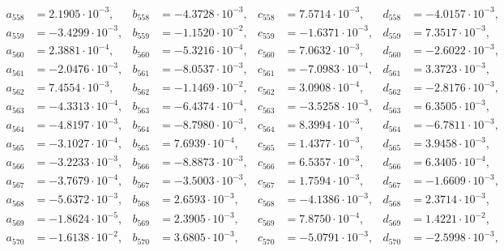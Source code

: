 \begin{align*}
  a_{ 558 } &= 2.1905 \cdot 10^{ -3 }, & b_{ 558 } &= -4.3728 \cdot 10^{ -3 }, & c_{ 558 } &= 7.5714 \cdot 10^{ -3 }, & d_{ 558 } &= -4.0157 \cdot 10^{ -3 }, \\ 
  a_{ 559 } &= -3.4299 \cdot 10^{ -3 }, & b_{ 559 } &= -1.1520 \cdot 10^{ -2 }, & c_{ 559 } &= -1.6371 \cdot 10^{ -3 }, & d_{ 559 } &= 7.3517 \cdot 10^{ -3 }, \\ 
  a_{ 560 } &= 2.3881 \cdot 10^{ -4 }, & b_{ 560 } &= -5.3216 \cdot 10^{ -4 }, & c_{ 560 } &= 7.0632 \cdot 10^{ -3 }, & d_{ 560 } &= -2.6022 \cdot 10^{ -3 }, \\ 
  a_{ 561 } &= -2.0476 \cdot 10^{ -3 }, & b_{ 561 } &= -8.0537 \cdot 10^{ -3 }, & c_{ 561 } &= -7.0983 \cdot 10^{ -4 }, & d_{ 561 } &= 3.3723 \cdot 10^{ -3 }, \\ 
  a_{ 562 } &= 7.4554 \cdot 10^{ -3 }, & b_{ 562 } &= -1.1469 \cdot 10^{ -2 }, & c_{ 562 } &= 3.0908 \cdot 10^{ -4 }, & d_{ 562 } &= -2.8176 \cdot 10^{ -3 }, \\ 
  a_{ 563 } &= -4.3313 \cdot 10^{ -4 }, & b_{ 563 } &= -6.4374 \cdot 10^{ -4 }, & c_{ 563 } &= -3.5258 \cdot 10^{ -3 }, & d_{ 563 } &= 6.3505 \cdot 10^{ -3 }, \\ 
  a_{ 564 } &= -4.8197 \cdot 10^{ -3 }, & b_{ 564 } &= -8.7980 \cdot 10^{ -3 }, & c_{ 564 } &= 8.3994 \cdot 10^{ -3 }, & d_{ 564 } &= -6.7811 \cdot 10^{ -3 }, \\ 
  a_{ 565 } &= -3.1027 \cdot 10^{ -4 }, & b_{ 565 } &= 7.6939 \cdot 10^{ -4 }, & c_{ 565 } &= 1.4377 \cdot 10^{ -3 }, & d_{ 565 } &= 3.9458 \cdot 10^{ -3 }, \\ 
  a_{ 566 } &= -3.2233 \cdot 10^{ -3 }, & b_{ 566 } &= -8.8873 \cdot 10^{ -3 }, & c_{ 566 } &= 6.5357 \cdot 10^{ -3 }, & d_{ 566 } &= 6.3405 \cdot 10^{ -4 }, \\ 
  a_{ 567 } &= -3.7679 \cdot 10^{ -4 }, & b_{ 567 } &= -3.5003 \cdot 10^{ -3 }, & c_{ 567 } &= 1.7594 \cdot 10^{ -3 }, & d_{ 567 } &= -1.6609 \cdot 10^{ -3 }, \\ 
  a_{ 568 } &= -5.6372 \cdot 10^{ -3 }, & b_{ 568 } &= 2.6593 \cdot 10^{ -3 }, & c_{ 568 } &= -4.1386 \cdot 10^{ -3 }, & d_{ 568 } &= 2.3714 \cdot 10^{ -3 }, \\ 
  a_{ 569 } &= -1.8624 \cdot 10^{ -5 }, & b_{ 569 } &= 2.3905 \cdot 10^{ -3 }, & c_{ 569 } &= 7.8750 \cdot 10^{ -4 }, & d_{ 569 } &= 1.4221 \cdot 10^{ -2 }, \\ 
  a_{ 570 } &= -1.6138 \cdot 10^{ -2 }, & b_{ 570 } &= 3.6805 \cdot 10^{ -3 }, & c_{ 570 } &= -5.0791 \cdot 10^{ -3 }, & d_{ 570 } &= -2.5998 \cdot 10^{ -3 }, \\ 

\end{align*}
